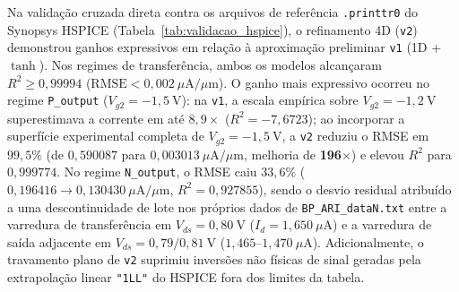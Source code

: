 Na valida\c{c}\~{a}o cruzada direta contra os arquivos de refer\^{e}ncia \texttt{.printtr0} do Synopsys HSPICE (Tabela~\ref{tab:validacao_hspice}), o refinamento 4D (\texttt{v2}) demonstrou ganhos expressivos em rela\c{c}\~{a}o \`{a} aproxima\c{c}\~{a}o preliminar \texttt{v1} (1D + $\tanh$). Nos regimes de transfer\^{e}ncia, ambos os modelos alcan\c{c}aram $R^2 \ge 0{,}99994$ ($\text{RMSE} < 0{,}002\ \mu\text{A}/\mu\text{m}$). O ganho mais expressivo ocorreu no regime \texttt{P\_output} ($V_{g2} = -1{,}5\ \text{V}$): na \texttt{v1}, a escala emp\'{i}rica sobre $V_{g2}=-1{,}2\ \text{V}$ superestimava a corrente em at\'{e} $8{,}9\times$ ($R^2 = -7{,}6723$); ao incorporar a superf\'{i}cie experimental completa de $V_{g2}=-1{,}5\ \text{V}$, a \texttt{v2} reduziu o RMSE em $99{,}5\%$ (de $0{,}590087$ para $0{,}003013\ \mu\text{A}/\mu\text{m}$, melhoria de \textbf{196$\times$}) e elevou $R^2$ para $0{,}999774$. No regime \texttt{N\_output}, o RMSE caiu $33{,}6\%$ ($0{,}196416 \to 0{,}130430\ \mu\text{A}/\mu\text{m}$, $R^2 = 0{,}927855$), sendo o desvio residual atribu\'{i}do a uma descontinuidade de lote nos pr\'{o}prios dados de \texttt{BP\_ARI\_dataN.txt} entre a varredura de transfer\^{e}ncia em $V_{ds}=0{,}80\ \text{V}$ ($I_d = 1{,}650\ \mu\text{A}$) e a varredura de sa\'{i}da adjacente em $V_{ds}=0{,}79/0{,}81\ \text{V}$ ($1{,}465\text{--}1{,}470\ \mu\text{A}$). Adicionalmente, o travamento plano de \texttt{v2} suprimiu invers\~{o}es n\~{a}o f\'{i}sicas de sinal geradas pela extrapola\c{c}\~{a}o linear \texttt{"1LL"} do HSPICE fora dos limites da tabela.

\begin{table}[htbp]
\centering
\caption{Valida\c{c}\~{a}o cruzada quantitativa entre \texttt{ngspice-47} (\texttt{v1} e \texttt{v2}) e arquivos \texttt{.printtr0} do HSPICE.}
\label{tab:validacao_hspice}
\end{table}

